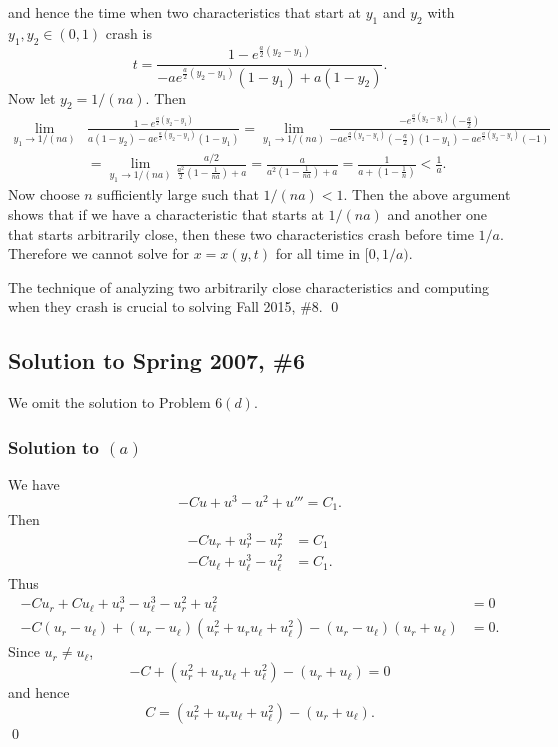 and hence the time when two characteristics that start at $y_{1}$ and $y_{2}$ with $y_{1}, y_{2} \in (0, 1)$ crash is
$$t = \frac{1 - e^{\frac{a}{2}(y_{2} - y_{1})}}{-ae^{\frac{a}{2}(y_{2} - y_{1})}(1 - y_{1}) + a(1 - y_{2})}.$$
Now let $y_{2} = 1/(na)$. Then
\begin{align*}
\lim_{y_{1} \rightarrow 1/(na)}&\frac{1 - e^{\frac{a}{2}(y_{2} - y_{1})}}{a(1 - y_{2}) - ae^{\frac{a}{2}(y_{2} - y_{1})}(1 - y_{1})} = \lim_{y_{1} \rightarrow 1/(na)}\frac{-e^{\frac{a}{2}(y_{2} - y_{1})}(-\frac{a}{2})}{-ae^{\frac{a}{2}(y_{2} - y_{1})}(-\frac{a}{2})(1 - y_{1}) - ae^{\frac{a}{2}(y_{2} - y_{1})}(-1)}\\
&= \lim_{y_{1} \rightarrow 1/(na)}\frac{a/2}{\frac{a^{2}}{2}(1 - \frac{1}{na}) + a} = \frac{a}{a^{2}(1 - \frac{1}{na}) + a} = \frac{1}{a + (1 - \frac{1}{n})} < \frac{1}{a}.
\end{align*}
Now choose $n$ sufficiently large such that $1/(na) < 1$.
Then the above argument shows that if we have a characteristic that starts at $1/(na)$ and another one that starts arbitrarily close,
then these two characteristics crash before time $1/a$. Therefore we cannot solve for $x = x(y, t)$
for all time in $[0, 1/a)$.
\begin{rem}
The technique of analyzing two arbitrarily close characteristics and computing when they crash is crucial to solving
Fall 2015, \#8. \hfill\qed
\end{rem}

\subsection*{Solution to Spring 2007, \#6}
We omit the solution to Problem $6(d)$.
\subsubsection*{Solution to $(a)$}
We have
$$-Cu + u^{3} - u^{2} + u''' = C_{1}.$$
Then
\begin{align*}
-Cu_{r} + u_{r}^{3} - u_{r}^{2} &= C_{1}\\
-Cu_{\ell} + u_{\ell}^{3} - u_{\ell}^{2} &= C_{1}.
\end{align*}
Thus
\begin{align*}
-Cu_{r} + Cu_{\ell} + u_{r}^{3} - u_{\ell}^{3} - u_{r}^{2} + u_{\ell}^{2} &= 0\\
-C(u_{r} - u_{\ell}) + (u_{r} - u_{\ell})(u_{r}^{2} + u_{r}u_{\ell} + u_{\ell}^{2}) - (u_{r} - u_{\ell})(u_{r} + u_{\ell}) &= 0.
\end{align*}
Since $u_{r} \neq u_{\ell}$,
$$-C + (u_{r}^{2} + u_{r}u_{\ell} + u_{\ell}^{2}) - (u_{r} + u_{\ell}) = 0$$
and hence
$$C = (u_{r}^{2} + u_{r}u_{\ell} + u_{\ell}^{2}) - (u_{r} + u_{\ell}).$$
\hfill\qed

